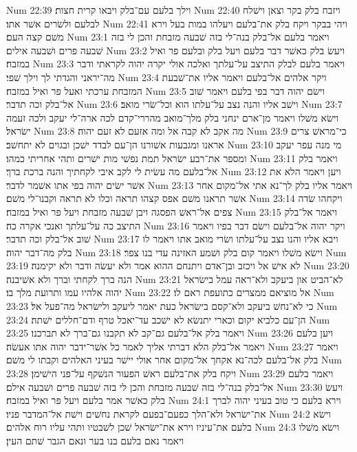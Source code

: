 Num 22:39  וילך בלעם עם־בלק ויבאו קרית חצות׃
Num 22:40  ויזבח בלק בקר וצאן וישׁלח לבלעם ולשׂרים אשׁר אתו׃
Num 22:41  ויהי בבקר ויקח בלק את־בלעם ויעלהו במות בעל וירא משׁם קצה העם׃
Num 23:1  ויאמר בלעם אל־בלק בנה־לי בזה שׁבעה מזבחת והכן לי בזה שׁבעה פרים ושׁבעה אילים׃
Num 23:2  ויעשׂ בלק כאשׁר דבר בלעם ויעל בלק ובלעם פר ואיל במזבח׃
Num 23:3  ויאמר בלעם לבלק התיצב על־עלתך ואלכה אולי יקרה יהוה לקראתי ודבר מה־יראני והגדתי לך וילך שׁפי׃
Num 23:4  ויקר אלהים אל־בלעם ויאמר אליו את־שׁבעת המזבחת ערכתי ואעל פר ואיל במזבח׃
Num 23:5  וישׂם יהוה דבר בפי בלעם ויאמר שׁוב אל־בלק וכה תדבר׃
Num 23:6  וישׁב אליו והנה נצב על־עלתו הוא וכל־שׂרי מואב׃
Num 23:7  וישׂא משׁלו ויאמר מן־ארם ינחני בלק מלך־מואב מהררי־קדם לכה ארה־לי יעקב ולכה זעמה ישׂראל׃
Num 23:8  מה אקב לא קבה אל ומה אזעם לא זעם יהוה׃
Num 23:9  כי־מראשׁ צרים אראנו ומגבעות אשׁורנו הן־עם לבדד ישׁכן ובגוים לא יתחשׁב׃
Num 23:10  מי מנה עפר יעקב ומספר את־רבע ישׂראל תמת נפשׁי מות ישׁרים ותהי אחריתי כמהו׃
Num 23:11  ויאמר בלק אל־בלעם מה עשׂית לי לקב איבי לקחתיך והנה ברכת ברך׃
Num 23:12  ויען ויאמר הלא את אשׁר ישׂים יהוה בפי אתו אשׁמר לדבר׃
Num 23:13  ויאמר אליו בלק לך־נא אתי אל־מקום אחר אשׁר תראנו משׁם אפס קצהו תראה וכלו לא תראה וקבנו־לי משׁם׃
Num 23:14  ויקחהו שׂדה צפים אל־ראשׁ הפסגה ויבן שׁבעה מזבחת ויעל פר ואיל במזבח׃
Num 23:15  ויאמר אל־בלק התיצב כה על־עלתך ואנכי אקרה כה׃
Num 23:16  ויקר יהוה אל־בלעם וישׂם דבר בפיו ויאמר שׁוב אל־בלק וכה תדבר׃
Num 23:17  ויבא אליו והנו נצב על־עלתו ושׂרי מואב אתו ויאמר לו בלק מה־דבר יהוה׃
Num 23:18  וישׂא משׁלו ויאמר קום בלק ושׁמע האזינה עדי בנו צפר׃
Num 23:19  לא אישׁ אל ויכזב ובן־אדם ויתנחם ההוא אמר ולא יעשׂה ודבר ולא יקימנה׃
Num 23:20  הנה ברך לקחתי וברך ולא אשׁיבנה׃
Num 23:21  לא־הביט און ביעקב ולא־ראה עמל בישׂראל יהוה אלהיו עמו ותרועת מלך בו׃
Num 23:22  אל מוציאם ממצרים כתועפת ראם לו׃
Num 23:23  כי לא־נחשׁ ביעקב ולא־קסם בישׂראל כעת יאמר ליעקב ולישׂראל מה־פעל אל׃
Num 23:24  הן־עם כלביא יקום וכארי יתנשׂא לא ישׁכב עד־יאכל טרף ודם־חללים ישׁתה׃
Num 23:25  ויאמר בלק אל־בלעם גם־קב לא תקבנו גם־ברך לא תברכנו׃
Num 23:26  ויען בלעם ויאמר אל־בלק הלא דברתי אליך לאמר כל אשׁר־ידבר יהוה אתו אעשׂה׃
Num 23:27  ויאמר בלק אל־בלעם לכה־נא אקחך אל־מקום אחר אולי יישׁר בעיני האלהים וקבתו לי משׁם׃
Num 23:28  ויקח בלק את־בלעם ראשׁ הפעור הנשׁקף על־פני הישׁימן׃
Num 23:29  ויאמר בלעם אל־בלק בנה־לי בזה שׁבעה מזבחת והכן לי בזה שׁבעה פרים ושׁבעה אילם׃
Num 23:30  ויעשׂ בלק כאשׁר אמר בלעם ויעל פר ואיל במזבח׃
Num 24:1  וירא בלעם כי טוב בעיני יהוה לברך את־ישׂראל ולא־הלך כפעם־בפעם לקראת נחשׁים וישׁת אל־המדבר פניו׃
Num 24:2  וישׂא בלעם את־עיניו וירא את־ישׂראל שׁכן לשׁבטיו ותהי עליו רוח אלהים׃
Num 24:3  וישׂא משׁלו ויאמר נאם בלעם בנו בער ונאם הגבר שׁתם העין׃
